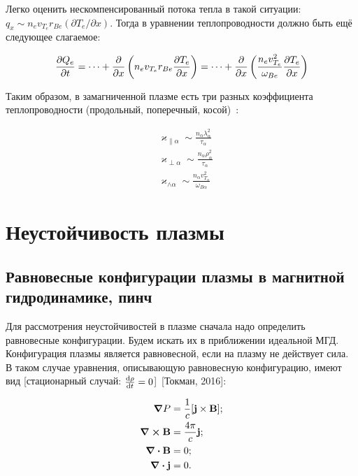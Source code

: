 \documentclass[10pt, a4paper]{article}
\newcommand{\Tokman}{~[Токман, 2016]}
\let\stdsection\section
\renewcommand\section{\newpage\stdsection}
\begin{document}
Легко оценить нескомпенсированный потока тепла в такой ситуации: $q_x \sim n_e v_{T_e} r_{Be} (\partial T_e/\partial x)$. Тогда в уравнении теплопроводности должно быть ещё следующее слагаемое:

\begin{equation*}
	\pdv{Q_e}{t} = \dots + \pdv{}{x}\left( n_e v_{T_e} r_{Be} \pdv{T_e}{x} \right) = \dots + \pdv{}{x}\left(\frac{n_e v_{T_e}^2}{\omega_{Be}}\pdv{T_e}{x} \right)
\end{equation*}

Таким образом, в замагниченной плазме есть три разных коэффициента теплопроводности (продольный, поперечный, косой)~\cite{kotelnikov}:

\begin{align*}
	&\varkappa_{\parallel\alpha} \sim \frac{n_\alpha \lambda_\alpha^2}{\tau_\alpha} \\
	&\varkappa_{\perp\alpha} \sim \frac{n_\alpha \rho_\alpha^2}{\tau_\alpha} \\
	&\varkappa_{\wedge\alpha} \sim \frac{n_\alpha v_{T_\alpha}^2}{\omega_{B\alpha}}
\end{align*}

\section{Неустойчивость плазмы}

\subsection{Равновесные конфигурации плазмы в магнитной гидродинамике, пинч} \label{subsec:pressure_equilibrium}

Для рассмотрения неустойчивостей в плазме сначала надо определить равновесные конфигурации. Будем искать их в приближении идеальной МГД. Конфигурация плазмы является равновесной, если на плазму не действует сила. В таком случае уравнения, описывающую равновесную конфигурацию, имеют вид [стационарный случай: $\dv{\rho}{t}=0$]\Tokman:

\begin{align*}
	\grad{P} &= \frac{1}{c}[\vb{j}\times\vb{B}]; \\
	\curl\vb{B} &= \frac{4\pi}{c}\vb{j}; \\
	\div{\vb{B}} &= 0; \\
	\div{\vb{j}} &= 0.
\end{align*}
\end{document}
